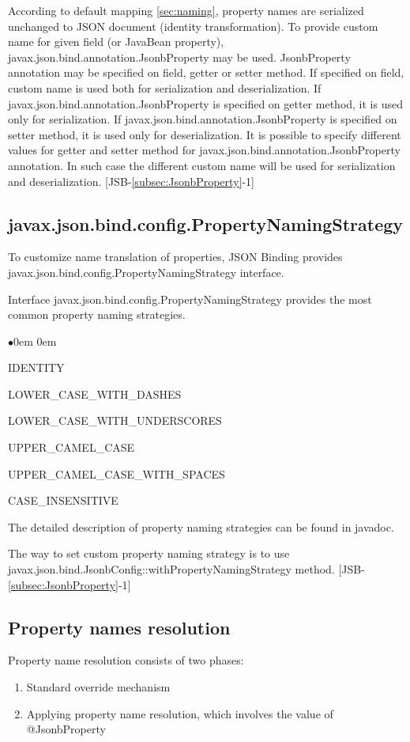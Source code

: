 According to default mapping \ref{sec:naming}, property names are serialized unchanged to JSON document (identity transformation). To provide custom name for given field (or JavaBean property), javax.json.bind.annotation.JsonbProperty may be used. JsonbProperty annotation may be specified on field, getter or setter method. If specified on field, custom name is used both for serialization and deserialization. If javax.json.bind.annotation.JsonbProperty is specified on getter method, it is used only for serialization. If javax.json.bind.annotation.JsonbProperty is specified on setter method, it is used only for deserialization. It is possible to specify different values for getter and setter method for javax.json.bind.annotation.JsonbProperty annotation. In such case the different custom name will be used for serialization and deserialization. [JSB-\ref{subsec:JsonbProperty}-1]

\subsection{javax.json.bind.config.PropertyNamingStrategy}
\label{subsec:PropertyNamingStrategy}

To customize name translation of properties, JSON Binding provides javax.json.bind.config.PropertyNamingStrategy interface.

Interface javax.json.bind.config.PropertyNamingStrategy provides the most common property naming strategies.

\begin{list}{$\bullet$}{\parsep 0em  0em}
\item IDENTITY
\item LOWER\_CASE\_WITH\_DASHES
\item LOWER\_CASE\_WITH\_UNDERSCORES
\item UPPER\_CAMEL\_CASE
\item UPPER\_CAMEL\_CASE\_WITH\_SPACES
\item CASE\_INSENSITIVE
\end{list}

The detailed description of property naming strategies can be found in javadoc.

The way to set custom property naming strategy is to use javax.json.bind.JsonbConfig::withPropertyNamingStrategy method. [JSB-\ref{subsec:JsonbProperty}-1]

\subsection{Property names resolution}
\label{sec:property_names_resolution}
Property name resolution consists of two phases:
\begin{enumerate}{\parsep 0em  0em}
\setlength{\itemsep}{0cm}%
\setlength{\parskip}{0cm}%
\item Standard override mechanism
\item Applying property name resolution, which involves the value of @JsonbProperty
\end{enumerate}

